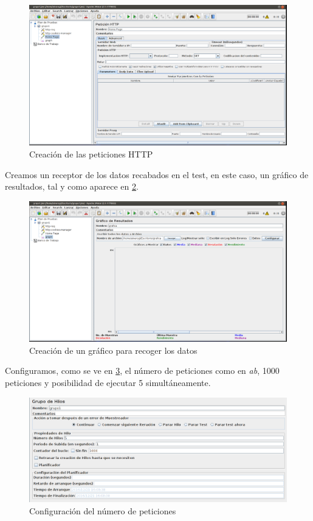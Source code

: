 \begin{figure}[H]
	\centering
	\includegraphics[scale=0.3]{cuestion4-04.png}
	\caption{Creación de las peticiones HTTP} \label{cuestion4-04}
\end{figure}

Creamos un receptor de los datos recabados en el test, en este caso, un gráfico de resultados, tal y como aparece en \ref{cuestion4-05}.

\begin{figure}[H]
	\centering
	\includegraphics[scale=0.3]{cuestion4-05.png}
	\caption{Creación de un gráfico para recoger los datos} \label{cuestion4-05}
\end{figure}

Configuramos, como se ve en \ref{cuestion4-06}, el número de peticiones como en \textit{ab}, 1000 peticiones y posibilidad de ejecutar 5 simultáneamente.

\begin{figure}[H]
	\centering
	\includegraphics[scale=0.4]{cuestion4-06.png}
	\caption{Configuración del número de peticiones} \label{cuestion4-06}
\end{figure}


